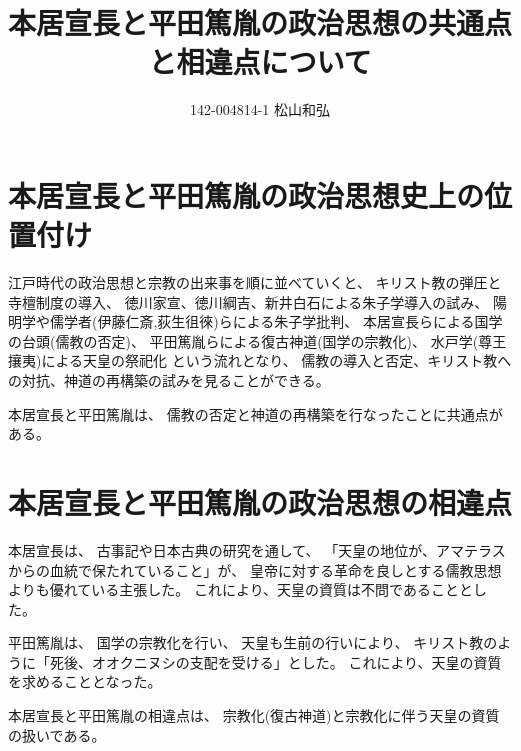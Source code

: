 \documentclass{jsarticle}
\begin{document}
\title{本居宣長と平田篤胤の政治思想の共通点と相違点について}
\author{142-004814-1 松山和弘}
\maketitle

\section{本居宣長と平田篤胤の政治思想史上の位置付け}

江戸時代の政治思想と宗教の出来事を順に並べていくと、
キリスト教の弾圧と寺檀制度の導入、
徳川家宣、徳川綱吉、新井白石による朱子学導入の試み、
陽明学や儒学者(伊藤仁斎,荻生徂徠)らによる朱子学批判、
本居宣長らによる国学の台頭(儒教の否定)、
平田篤胤らによる復古神道(国学の宗教化)、
水戸学(尊王攘夷)による天皇の祭祀化
という流れとなり、
儒教の導入と否定、キリスト教への対抗、神道の再構築の試みを見ることができる。

本居宣長と平田篤胤は、
儒教の否定と神道の再構築を行なったことに共通点がある。


\section{本居宣長と平田篤胤の政治思想の相違点}

本居宣長は、
古事記や日本古典の研究を通して、
「天皇の地位が、アマテラスからの血統で保たれていること」が、
皇帝に対する革命を良しとする儒教思想よりも優れている主張した。
これにより、天皇の資質は不問であることとした。

平田篤胤は、
国学の宗教化を行い、
天皇も生前の行いにより、
キリスト教のように「死後、オオクニヌシの支配を受ける」とした。
これにより、天皇の資質を求めることとなった。

本居宣長と平田篤胤の相違点は、
宗教化(復古神道)と宗教化に伴う天皇の資質の扱いである。
\end{document}

